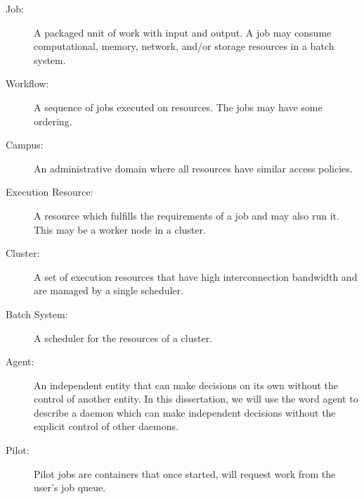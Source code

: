 \begin{description}
	\item[Job:] A packaged unit of work with input and output.  A job may consume computational, memory, network, and/or storage resources in a batch system.
	\item[Workflow:] A sequence of jobs executed on resources.  The jobs may have some ordering.
	\item[Campus:] An administrative domain where all resources have similar access policies.
	\item[Execution Resource:] A resource which fulfills the requirements of a job and may also run it.  This may be a worker node in a cluster.
	\item[Cluster:] A set of execution resources that have high interconnection bandwidth and are managed by a single scheduler.
	\item[Batch System:] A scheduler for the resources of a cluster.
	\item[Agent:] An independent entity that can make decisions on its own without the control of another entity.  In this dissertation, we will use the word agent to describe a daemon which can make independent decisions without the explicit control of other daemons.
	\item[Pilot:] Pilot jobs are containers that once started, will request work from the user's job queue.
\end{description}



